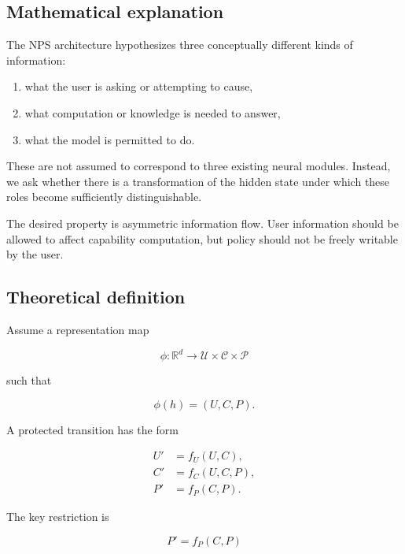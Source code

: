 \documentclass[11pt]{article}
\newcommand{\R}{\mathbb{R}}
\begin{document}
\subsection*{Mathematical explanation}

The NPS architecture hypothesizes three conceptually different kinds of
information:

\begin{enumerate}
    \item what the user is asking or attempting to cause,
    \item what computation or knowledge is needed to answer,
    \item what the model is permitted to do.
\end{enumerate}

These are not assumed to correspond to three existing neural modules.
Instead, we ask whether there is a transformation of the hidden state under
which these roles become sufficiently distinguishable.

The desired property is asymmetric information flow. User information should
be allowed to affect capability computation, but policy should not be freely
writable by the user.

\subsection*{Theoretical definition}

Assume a representation map

\begin{equation}
\phi:\R^d
\rightarrow
\mathcal U\times\mathcal C\times\mathcal P
\end{equation}

such that

\begin{equation}
\phi(h)=(U,C,P).
\end{equation}

A protected transition has the form

\begin{align}
U'&=f_U(U,C),\\
C'&=f_C(U,C,P),\\
P'&=f_P(C,P).
\end{align}

The key restriction is

\begin{equation}
\boxed{
P'=f_P(C,P)
}
\end{equation}
\end{document}
